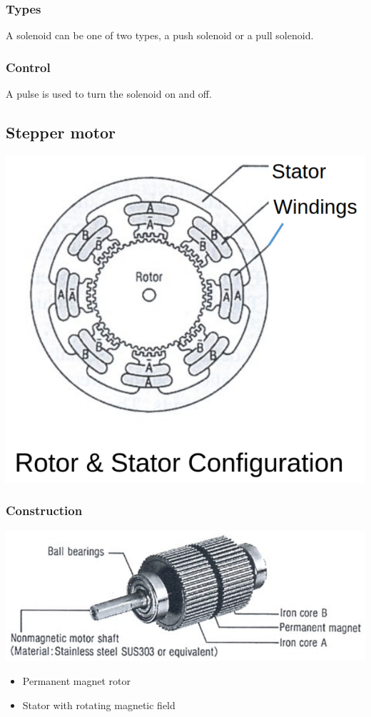 \documentclass[11pt]{article}
\begin{document}
\subsubsection{Types}
\label{sec:org979fcb3}
A solenoid can be one of two types, a push solenoid or a pull solenoid.
\subsubsection{Control}
\label{sec:org5b84369}
A pulse is used to turn the solenoid on and off.
\subsection{Stepper motor}
\label{sec:orgcf818d4}
\begin{center}
\includegraphics[scale=0.5]{./images/stepper-motor-configuration.png}
\end{center}
\subsubsection{Construction}
\label{sec:org1405cd0}
\begin{center}
\includegraphics[width=.9\linewidth]{./images/stepper-motor-construction.png}
\end{center}
\begin{itemize}
\item Permanent magnet rotor
\item Stator with rotating magnetic field
\end{itemize}
\end{document}
